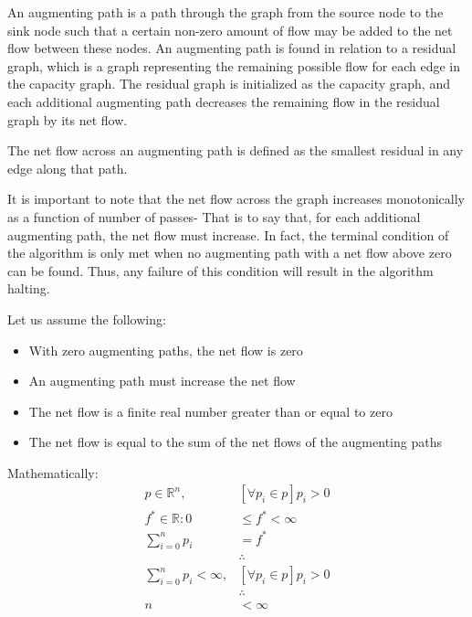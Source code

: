 \documentclass[12pt]{amsart}
\begin{document}
    An augmenting path is a path through the graph from the
    source node to the sink node such that a certain non-zero
    amount of flow may be added to the net flow between these
    nodes. An augmenting path is found in relation to a residual
    graph, which is a graph representing the remaining possible
    flow for each edge in the capacity graph. The residual graph
    is initialized as the capacity graph, and each additional
    augmenting path decreases the remaining flow in the residual
    graph by its net flow.

    The net flow across an augmenting path is defined as the
    smallest residual in any edge along that path.

    It is important to note that the net flow across the graph
    increases monotonically as a function of number of passes-
    That is to say that, for each additional augmenting path,
    the net flow must increase. In fact, the terminal condition
    of the algorithm is only met when no augmenting path with a
    net flow above zero can be found. Thus, any failure of this
    condition will result in the algorithm halting.

    Let us assume the following:
    \begin{itemize}
        \item With zero augmenting paths, the net flow is zero
        \item An augmenting path must increase the net flow
        \item The net flow is a finite real number greater than
            or equal to zero
        \item The net flow is equal to the sum of the net flows
            of the augmenting paths
    \end{itemize}

    Mathematically:
    \[
    \begin{aligned}
        p \in \mathbb{R}^n , &\left[ \forall p_i \in p \right] p_i > 0 \\
        f^* \in \mathbb{R}: 0 &\le f^* < \infty \\
        \sum_{i = 0}^n { p_i } &= f^* \\
        &\therefore \\
        \sum_{i = 0}^n p_i < \infty , &\left[ \forall p_i \in p \right] p_i > 0 \\
        &\therefore \\
        n &< \infty \\
    \end{aligned}
    \]
\end{document}
